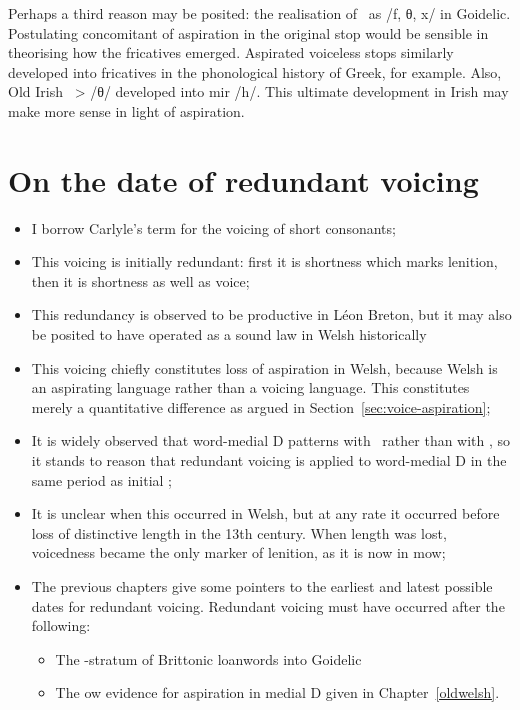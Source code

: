 Perhaps a third reason may be posited: the realisation of \lT\ as /f, θ, x/ in Goidelic. Postulating concomitant of aspiration in the original stop would be sensible in theorising how the fricatives emerged. Aspirated voiceless stops similarly developed into fricatives in the phonological history of Greek, for example. Also, Old Irish \lT\ > /θ/ developed into \gls{mir} /h/. This ultimate development in Irish may make more sense in light of aspiration.

\section{On the date of redundant voicing}
\label{sec:date-redund-voic}

\begin{itemize}
\item I borrow Carlyle's term for the voicing of short consonants; 
\item This voicing is initially redundant: first it is shortness which marks lenition, then it is shortness as well as voice;
\item This redundancy is observed to be productive in Léon Breton, but it may also be posited to have operated as a sound law in Welsh historically
\item This voicing chiefly constitutes loss of aspiration in Welsh, because Welsh is an aspirating language rather than a voicing language. This constitutes merely a quantitative difference as argued in Section~\ref{sec:voice-aspiration};
\item It is widely observed that word-medial \gls{D} patterns with \lT\ rather than with \xD, so it stands to reason that redundant voicing is applied to word-medial \gls{D} in the same period as initial \lT;
\item It is unclear when this occurred in Welsh, but at any rate it occurred before loss of distinctive length in the 13th century. When length was lost, voicedness became the only marker of lenition, as it is now in \gls{mow};
\item The previous chapters give some pointers to the earliest and latest possible dates for redundant voicing. Redundant voicing must have occurred after the following:
  \begin{itemize}
  \item The -stratum of Brittonic loanwords into Goidelic
  \item The \gls{ow} evidence for aspiration in medial \gls{D} given in Chapter~\ref{oldwelsh}.
  \end{itemize}
  

\end{itemize}
